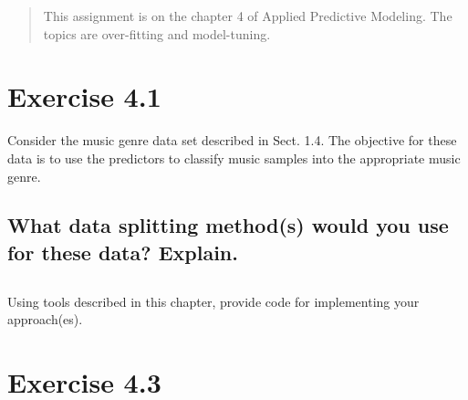 \documentclass[12pt]{article}
\begin{document}

\maketitle

\begin{abstract}
This assignment is on the chapter 4 of Applied Predictive Modeling. The topics are over-fitting and model-tuning.
\end{abstract}

\section{Exercise 4.1}
Consider the music genre data set described in Sect. 1.4. The objective
for these data is to use the predictors to classify music samples into the
appropriate music genre.


\subsection{What data splitting method(s) would you use for these data? Explain.
}


\subsection{}
Using tools described in this chapter, provide code for implementing your
approach(es).



\section{Exercise 4.3}
\end{document}
